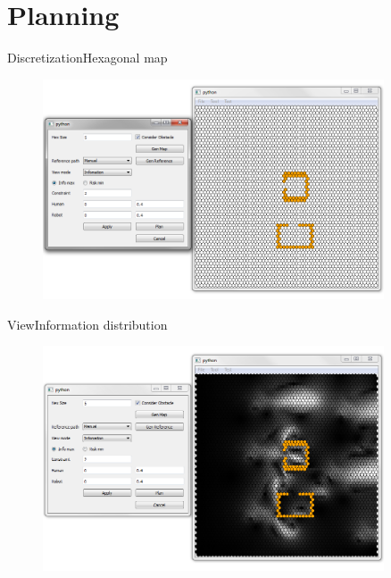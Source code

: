 \section{Planning}

\begin{frame}{Discretization}{Hexagonal map}

\begin{figure}
\centering
\includegraphics[width = 0.9\textwidth]{./screenshot/discretization.png}
\end{figure}

\end{frame}

\begin{frame}{View}{Information distribution}

\begin{figure}
\centering
\includegraphics[width = 0.9\textwidth]{./screenshot/information_view.png}
\end{figure}

\end{frame}

